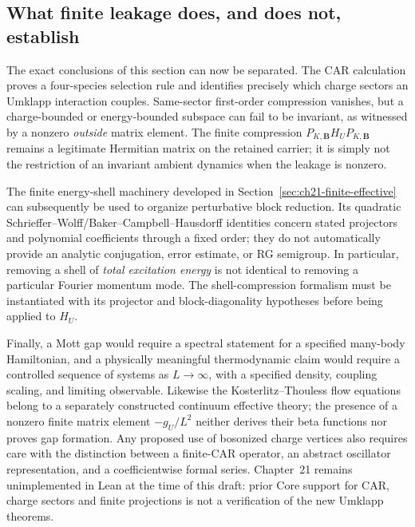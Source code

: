 \subsection*{What finite leakage does, and does not, establish}

The exact conclusions of this section can now be separated.  The CAR
calculation proves a four-species selection rule and identifies precisely
which charge sectors an Umklapp interaction couples.  Same-sector
first-order compression vanishes, but a charge-bounded or energy-bounded
subspace can fail to be invariant, as witnessed by a nonzero
\emph{outside} matrix element.  The finite compression
\(P_{K,\mathbf B}H_UP_{K,\mathbf B}\) remains a legitimate Hermitian
matrix on the retained carrier; it is simply not the restriction of an
invariant ambient dynamics when the leakage is nonzero.

The finite energy-shell machinery developed in Section~\ref{sec:ch21-finite-effective}
can subsequently be used to organize perturbative block reduction. Its
quadratic Schrieffer--Wolff/Baker--Campbell--Hausdorff identities concern
stated projectors and polynomial coefficients through a fixed order; they do
not automatically provide an analytic conjugation, error estimate, or
RG semigroup.  In particular, removing a shell of \emph{total excitation
energy} is not identical to removing a particular Fourier momentum
mode.  The shell-compression formalism must be instantiated with its
projector and block-diagonality hypotheses before being applied to
\(H_U\).

Finally, a Mott gap would require a spectral statement for a specified
many-body Hamiltonian, and a physically meaningful thermodynamic claim
would require a controlled sequence of systems as \(L\to\infty\),
with a specified density, coupling scaling, and limiting observable.
Likewise the Kosterlitz--Thouless flow equations belong to a
separately constructed continuum effective theory; the presence of a
nonzero finite matrix element \(-g_U/L^2\) neither derives their beta
functions nor proves gap formation.  Any proposed use of bosonized
charge vertices also requires care with the distinction between a
finite-CAR operator, an abstract oscillator representation, and a
coefficientwise formal series.  Chapter~21 remains unimplemented in
Lean at the time of this draft: prior Core support for CAR, charge
sectors and finite projections is not a verification of the new
Umklapp theorems.

